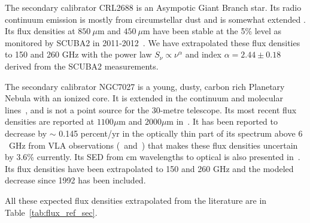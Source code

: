 
The secondary calibrator CRL2688 is an Asympotic Giant Branch
star. Its radio continuum emission is mostly from circumstellar dust
and is somewhat extended \cite{Knapp}.  Its flux densities at
$850\ \mu$m and $450 \ \mu$m have been stable at the 5\% level as
monitored by SCUBA2 in 2011-2012~\citep{Dempsey2013_SCUBA2}.
We have extrapolated these flux densities to 150 and 260 GHz
with the power law $S_{\nu} \propto \nu^{\alpha}$ and index
$\alpha=2.44\pm0.18$ derived from the SCUBA2 measurements.


The secondary calibrator NGC7027 is a young, dusty, carbon rich
Planetary Nebula with an ionized core.  It is extended in the
continuum and molecular lines~\cite{Bieging1991}, and is not a point
source for the 30-metre telescope.  Its most recent flux densities are
reported at $1100\mu$m and $2000\mu$m in~\cite{Hoare1992}. It has
been reported to decrease by $\sim$ 0.145 percent/yr in the optically
thin part of its spectrum above $6$~GHz from VLA
observations (\cite{Zijlstra2008}~and~\cite{Hafez2008}) that makes
these flux densities uncertain by 3.6\% currently. Its SED from cm
wavelengths to optical is also presented in~\cite{Hafez2008}.
Its flux densities have been extrapolated to 150 and 260 GHz and the
modeled decrease since 1992 has been included.

All these expected flux densities extrapolated from the literature are in Table~\ref{tab:flux_ref_sec}.


